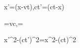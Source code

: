 x'=\gamma(x-vt),\qquad ct'=\gamma(ct-\beta x)

\beta=\frac vc,\qquad \gamma=

x'^2-(ct')^2=x^2-(ct)^2
